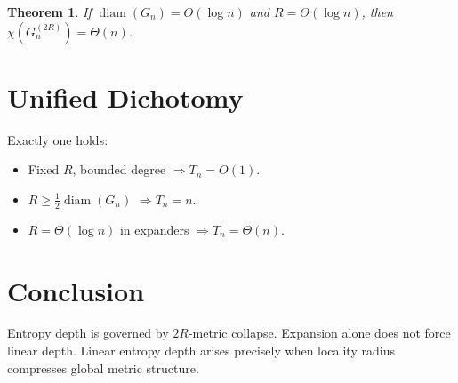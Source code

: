 \documentclass[11pt]{article}
\newtheorem{theorem}{Theorem}
\begin{document}
\begin{theorem}
If $\operatorname{diam}(G_n)=O(\log n)$
and $R=\Theta(\log n)$,
then $\chi(G_n^{(2R)})=\Theta(n)$.
\end{theorem}

\section{Unified Dichotomy}

Exactly one holds:

\begin{itemize}
\item Fixed $R$, bounded degree $\Rightarrow T_n = O(1)$.
\item $R \ge \tfrac{1}{2}\operatorname{diam}(G_n)$ $\Rightarrow T_n = n$.
\item $R=\Theta(\log n)$ in expanders $\Rightarrow T_n=\Theta(n)$.
\end{itemize}

\section{Conclusion}

Entropy depth is governed by $2R$-metric collapse.
Expansion alone does not force linear depth.
Linear entropy depth arises precisely when locality radius
compresses global metric structure.
\end{document}
